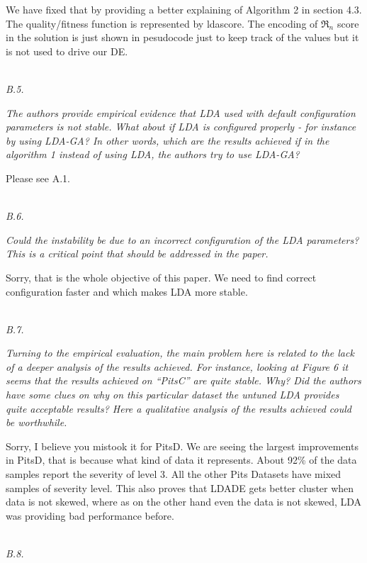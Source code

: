 \documentclass[conference]{IEEEtran}
\begin{document}
We have fixed that by providing a better explaining of Algorithm 2 in section 4.3. The quality/fitness function is represented by ldascore. The encoding of $\Re_n$ score in the solution is just shown in pesudocode just to keep track of the values but it is not used to drive our DE. 

\noindent
\textit{\\B.5.}  

\textit{The authors provide empirical evidence that LDA used with default configuration parameters is not stable. What about if LDA is configured properly - for instance by using LDA-GA? In other words, which are the results achieved if in the algorithm 1 instead of using LDA, the authors try to use LDA-GA?\\}

Please see A.1.

\noindent
\textit{\\B.6.}  

\textit{Could the instability be due to an incorrect configuration of the LDA parameters? This is a critical point that should be addressed in the paper.\\}

Sorry, that is the whole objective of this paper. We need to find correct configuration faster and which makes LDA more stable.

\noindent
\textit{\\B.7.}   

\textit{Turning to the empirical evaluation, the main problem here is related to the lack of a deeper analysis of the results achieved. For instance, looking at Figure 6 it seems that the results achieved on “PitsC” are quite stable. Why? Did the authors have some clues on why on this particular dataset the untuned LDA provides quite acceptable results? Here a qualitative analysis of the results achieved could be worthwhile.\\}

Sorry, I believe you mistook it for PitsD. We are seeing the largest improvements in PitsD, that is because what kind of data it represents. About 92\% of the data samples report the severity of level 3.  All the other Pits Datasets have mixed samples of severity level. This also proves that LDADE gets better cluster when data is not skewed, where as on the other hand even the data is not skewed, LDA was providing bad performance before.

\noindent
\textit{\\B.8.} 
\end{document}
